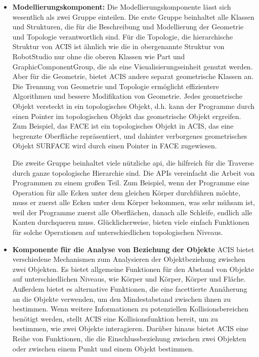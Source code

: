 \documentclass[14pt,a4paper,titlepage]{article}
\begin{document}
			\begin{itemize}
				\item 
				\textbf{Modellierungskomponent:}
				Die Modellierungskomponente lässt sich wesentlich als zwei Gruppe einteilen.
				\bigbreak
				 Die erste Gruppe beinhaltet alle Klassen und Strukturen, die für die Beschreibung und Modellierung der Geometrie und Topologie verantwortlich sind. Für die Topologie, die hierarchische Struktur von ACIS ist ähnlich wie die in obergenannte Struktur von RobotStudio nur ohne die oberen Klassen wie Part und GraphicComponentGroup, die als eine Visualisierungseinheit genutzt werden. Aber für die Geometrie, bietet ACIS andere separat geometrische Klassen an. Die Trennung von Geometrie und Topologie ermöglicht effizientere Algorithmen und bessere Modifikation von Geometrie. Jedes geometrische Objekt versteckt in ein topologisches Objekt, d.h. kann der Programme durch einen Pointer im topologischen Objekt das geometrische Objekt ergreifen. Zum Beispiel, das FACE ist ein topologisches Objekt in ACIS, das eine begrenzte Oberfläche repräsentiert, und dahinter verborgenes geometrisches Objekt SURFACE wird durch einen Pointer in FACE zugewiesen.
				 
				 Die zweite Gruppe beinhaltet viele nützliche \acs{api}, die hilfreich für die Traverse durch ganze topologische Hierarchie sind.  Die APIs vereinfacht die Arbeit von Programmen zu einem großen Teil. Zum Beispiel, wenn der Programme eine Operation für alle Ecken unter dem gleichen Körper durchführen möchte, muss er zuerst alle Ecken unter dem Körper bekommen, was sehr mühsam ist, weil der Programme zuerst alle Oberflächen, danach alle Schleife, endlich alle Kanten durchqueren muss. Glücklicherweise, bieten viele einfach Funktionen für solche Operationen auf unterschiedlichen topologischen Niveaus. 
				\pagebreak
				\item 
				\textbf{Komponente für die Analyse von Beziehung der Objekte}
				ACIS bietet verschiedene Mechanismen zum Analysieren der Objektbeziehung zwischen zwei Objekten. Es bietet allgemeine Funktionen für den Abstand von Objekte auf unterschiedlichen Niveaus, wie Körper und Körper, Körper und Fläche. Außerdem bietet es alternative Funktionen, die eine facettierte Annäherung an die Objekte verwenden, um den Mindestabstand zwischen ihnen zu bestimmen. Wenn weitere Informationen zu potenziellen Kollisionsbereichen benötigt werden, stellt ACIS eine Kollisionsfunktion bereit, um zu bestimmen, wie zwei Objekte interagieren. Darüber hinaus bietet ACIS eine Reihe von Funktionen, die die Einschlussbeziehung zwischen zwei Objekten oder zwischen einem Punkt und einem Objekt bestimmen.
				
			\end{itemize}
\end{document}
